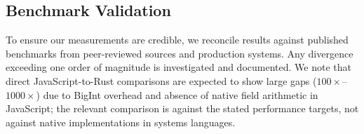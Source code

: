 \subsection{Benchmark Validation}

To ensure our measurements are credible, we reconcile results against published benchmarks from peer-reviewed sources and production systems. Any divergence exceeding one order of magnitude is investigated and documented. We note that direct JavaScript-to-Rust comparisons are expected to show large gaps ($100\times$--$1000\times$) due to BigInt overhead and absence of native field arithmetic in JavaScript; the relevant comparison is against the stated performance targets, not against native implementations in systems languages.
